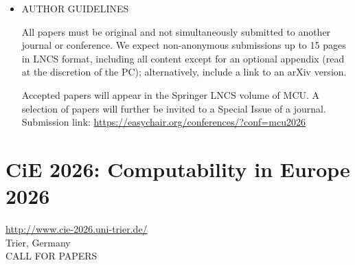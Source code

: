 \documentclass[prodmode,acmtecs]{acmsmall} %
\begin{document}
\begin{itemize}
\begin{itemize}\item  Martin Kutrib (University of Gießen, Germany)
\item  Olivier Bournez (Ecole Polytechnique, Paris, France) - tutorial at CiE.
\item  Joint CiE special session “At the Borderline of Universality”:
\item  Artiom Alhazov, State University of Moldova
\item  Matthew Cook, University of Groningen
\item  Gemma De les Coves, Pompeu Fabra University, Barcelona
\item  Victor Mitrana, University of Bucharest
\end{itemize} 
\item  AUTHOR GUIDELINES 
 
  All papers must be original and not simultaneously submitted to another journal or conference. We expect non-anonymous submissions up to 15 pages in LNCS format, including all content except for an optional appendix (read at the discretion of the PC); alternatively, include a link to an arXiv version. 
 
  Accepted papers will appear in the Springer LNCS volume of MCU. A selection of papers will further be invited to a Special Issue of a journal. Submission link: \href{https://easychair.org/conferences/?conf=mcu2026}{https://easychair.org/conferences/?conf=mcu2026} 
 
\end{itemize}\section{CiE 2026: Computability in Europe 2026}\label{CiE2026}  \href{http://www.cie-2026.uni-trier.de/}{http://www.cie-2026.uni-trier.de/}\\ 
  Trier, Germany\\ 
CALL FOR PAPERS  
\end{document}
